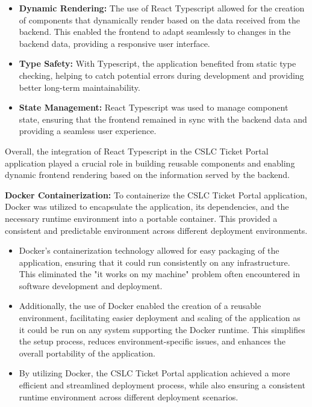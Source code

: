 \documentclass[oneside,openany,obeyspaces]{book}
\begin{document}
\begin{flushleft}
\begin{itemize}
        \item \textbf{Dynamic Rendering:} The use of React Typescript allowed for the creation of components that dynamically render based on the data received from the backend. This enabled the frontend to adapt seamlessly to changes in the backend data, providing a responsive user interface.

        \item \textbf{Type Safety:} With Typescript, the application benefited from static type checking, helping to catch potential errors during development and providing better long-term maintainability.

        \item \textbf{State Management:} React Typescript was used to manage component state, ensuring that the frontend remained in sync with the backend data and providing a seamless user experience.

    \end{itemize}

    Overall, the integration of React Typescript in the CSLC Ticket Portal application played a crucial role in building reusable components and enabling dynamic frontend rendering based on the information served by the backend.

    \textbf{Docker Containerization:}
    To containerize the CSLC Ticket Portal application, Docker was utilized to encapsulate the application, its dependencies, and the necessary runtime environment into a portable container. This provided a consistent and predictable environment across different deployment environments.
    \begin{itemize}
        \item Docker's containerization technology allowed for easy packaging of the application, ensuring that it could run consistently on any infrastructure. This eliminated the "it works on my machine" problem often encountered in software development and deployment.
        \item Additionally, the use of Docker enabled the creation of a reusable environment, facilitating easier deployment and scaling of the application as it could be run on any system supporting the Docker runtime. This simplifies the setup process, reduces environment-specific issues, and enhances the overall portability of the application.
        \item By utilizing Docker, the CSLC Ticket Portal application achieved a more efficient and streamlined deployment process, while also ensuring a consistent runtime environment across different deployment scenarios.
    \end{itemize}


\end{flushleft}
\end{document}
